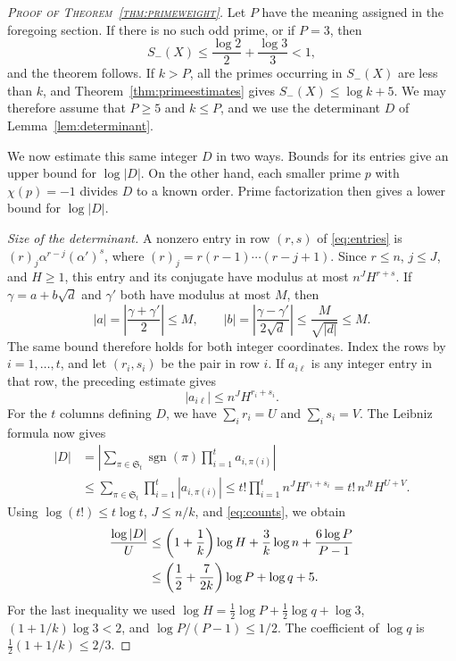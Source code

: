 \documentclass[11pt,twoside,leqno]{article}
\theoremstyle{apostol}
\begin{document}
\begin{proof}[\normalfont\scshape Proof of Theorem~\ref{thm:primeweight}]
Let \(P\) have the meaning assigned in the foregoing section. If there is
no such odd prime, or if \(P=3\), then
\[
 S_-(X)\le\frac{\log2}{2}+\frac{\log3}{3}<1,
\]
and the theorem follows. If \(k>P\), all the primes occurring in
\(S_-(X)\) are less than \(k\), and Theorem~\ref{thm:primeestimates}
gives \(S_-(X)\le\log k+5\). We may therefore assume that \(P\ge5\)
and \(k\le P\), and we use the determinant \(D\) of
Lemma~\ref{lem:determinant}.

We now estimate this same integer \(D\) in two ways. Bounds for its entries
give an upper bound for \(\log|D|\). On the other hand, each smaller prime
\(p\) with \(\chi(p)=-1\) divides \(D\) to a known order. Prime
factorization then gives a lower bound for \(\log|D|\).

\medskip
\noindent\textit{Size of the determinant.}
A nonzero entry in row \((r,s)\) of \eqref{eq:entries} is
\((r)_j\alpha^{r-j}(\alpha')^s\), where
\((r)_j=r(r-1)\cdots(r-j+1)\). Since \(r\le n\), \(j\le J\), and
\(H\ge1\), this entry and its conjugate have modulus at most
\(n^JH^{r+s}\). If \(\gamma=a+b\sqrt d\) and \(\gamma'\) both have
modulus at most \(M\), then
\[
 |a|=\left|\frac{\gamma+\gamma'}2\right|\le M,
 \qquad
 |b|=\left|\frac{\gamma-\gamma'}{2\sqrt d}\right|
       \le\frac M{\sqrt{|d|}}\le M.
\]
The same bound therefore holds for both integer coordinates. Index the rows
by \(i=1,\ldots,t\), and let \((r_i,s_i)\) be the pair in row \(i\). If
\(a_{i\ell}\) is any integer entry in that row, the preceding estimate gives
\[
 |a_{i\ell}|\le n^JH^{r_i+s_i}.
\]
For the \(t\) columns defining \(D\), we have
\(\sum_i r_i=U\) and \(\sum_i s_i=V\). The Leibniz formula now gives
\begin{align*}
 |D|
 &=\left|\sum_{\pi\in\mathfrak S_t}\operatorname{sgn}(\pi)
       \prod_{i=1}^t a_{i,\pi(i)}\right|\\
 &\le\sum_{\pi\in\mathfrak S_t}\prod_{i=1}^t|a_{i,\pi(i)}|
 \le t!\prod_{i=1}^t n^JH^{r_i+s_i}
 =t!\,n^{Jt}H^{U+V}.
\end{align*}
Using \(\log(t!)\le t\log t\), \(J\le n/k\), and \eqref{eq:counts},
we obtain
\begin{align}
 \frac{\log|D|}{U}
 &\le\left(1+\frac1k\right)\log H
       +\frac3k\log n+\frac{6\log P}{P-1}\notag\\
 &\le\left(\frac12+\frac7{2k}\right)\log P+\log q+5.
 \label{eq:size}
\end{align}
For the last inequality we used
\(\log H=\tfrac12\log P+\tfrac12\log q+\log3\),
\((1+1/k)\log3<2\), and \(\log P/(P-1)\le1/2\). The coefficient of
\(\log q\) is \(\tfrac12(1+1/k)\le2/3\).


\end{proof}
\end{document}
